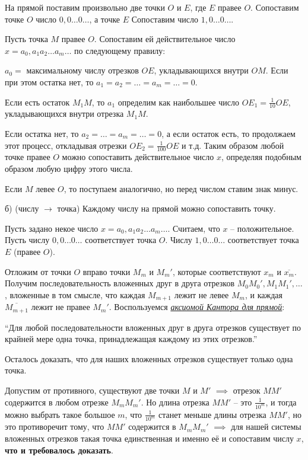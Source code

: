 \documentclass{article}
\begin{document}
На прямой поставим произвольно две точки $O$ и $E$, где $E$ правее $O$.
Сопоставим точке $O$ число $0,0 \dots 0 \dots$, а точке $E$
Сопоставим число $1,0 \dots 0 \dots$.

Пусть точка $M$ правее $O$. Сопоставим ей действительное число
$x = a_0,a_1 a_2 \dots a_m \dots$ по следующему правилу:

$a_0 = $ максимальному числу отрезков $OE$, укладывающихся внутри $OM$.
Если при этом остатка нет, то $a_1 = a_2 = \dots = a_m = \dots = 0$.

Если есть остаток $M_1M$, то $a_1$ определим как наибольшее число
$OE_1 = \frac{1}{10}OE$, укладывающихся внутри отрезка $M_1M$.

Если остатка нет, то $a_2 = \dots = a_m = \dots = 0$, а если остаток есть,
то продолжаем этот процесс, откладывая отрезки $OE_2 = \frac{1}{100}OE$ 
и т.д. Таким образом любой точке правее $O$ можно сопоставить действительное
число $x$, определяя подобным образом любую цифру этого числа.

Если $M$ левее $O$, то поступаем аналогично, но перед числом ставим знак минус.

б) (числу $\rightarrow$ точка) Каждому числу на прямой можно сопоставить точку.

Пусть задано некое число $x = a_0,a_1 a_2 \dots a_m \dots$. Считаем, что
$x$ -- положительное. Пусть числу $0,0 \dots 0 \dots$ соответствует точка $O$.
Числу $1,0 \dots 0 \dots$ соответствует точка $E$ (правее $O$).

Отложим от точки $O$ вправо точки $M_m$ и $M_m'$, которые соответствуют
$x_m$ и $\overline{x_m}$. Получим последовательность вложенных друг в друга
отрезков $M_0M_0', M_1M_1', \dots$, вложенные в том смысле, что каждая
$M_{m+1}$ лежит не левее $M_m$, и каждая $\overline{M_{m+1}}$ лежит
не правее $M_m'$. Воспользуемся \underline{\textit{аксиомой Кантора для прямой}}:

``Для любой последовательности вложенных друг в друга отрезков существует
по крайней мере одна точка, принадлежащая каждому из этих отрезков.''

Осталось доказать, что для наших вложенных отрезков существует только одна точка.

Допустим от противного, существуют две точки $M$ и $M'$ $\implies$ отрезок
$MM'$ содержится в любом отрезке $M_mM_m'$. Но длина отрезка $MM'$ -- это
$\frac{1}{10^m}$, и тогда можно выбрать такое большое $m$, что $\frac{1}{10^m}$
станет меньше длины отрезка $MM'$, но это противоречит тому, что $MM'$ содержится в
$M_mM_m'$ $\implies$ для нашей системы вложенных отрезков такая точка единственная и
именно её и сопоставим числу $x$, \textbf{что и требовалось доказать}.
\end{document}
